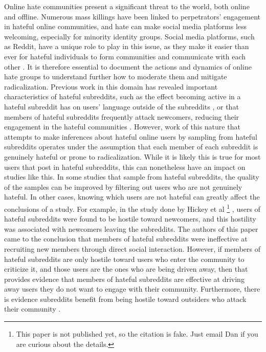 \documentclass[10pt,twocolumn,letterpaper]{article}
\begin{document}
Online hate communities present a significant threat to the world, both online and offline. Numerous mass killings have been linked to perpetrators’ engagement in hateful online communities, and hate can make social media platforms less welcoming, especially for minority identity groups. Social media platforms, such as Reddit, have a unique role to play in this issue, as they make it easier than ever for hateful individuals to form communities and communicate with each other \cite{caiani2015transnationalization}. It is therefore essential to document the actions and dynamics of online hate groups to understand further how to moderate them and mitigate radicalization. Previous work in this domain has revealed important characteristics of hateful subreddits, such as the effect becoming active in a hateful subreddit has on users' language outside of the subreddits \cite{Schmitz2022}, or that members of hateful subreddits frequently attack newcomers, reducing their engagement in the hateful communities \cite{hickey2023reddit}. However, work of this nature that attempts to make inferences about hateful online users by sampling from hateful subreddits operates under the assumption that each member of each subreddit is genuinely hateful or prone to radicalization. While it is likely this is true for most users that post in hateful subreddits, this can nonetheless have an impact on studies like this. In some studies that sample from hateful subreddits, the quality of the samples can be improved by filtering out users who are not genuinely hateful. In other cases, knowing which users are not hateful can greatly affect the conclusions of a study. For example, in the study done by Hickey et al \footnote{This paper is not published yet, so the citation is fake. Just email Dan if you are curious about the details.} \cite{hickey2023reddit}, users of hateful subreddits were found to be hostile toward newcomers, and this hostility was associated with newcomers leaving the subreddits. The authors of this paper came to the conclusion that members of hateful subreddits were ineffective at recruiting new members through direct social interaction. However, if members of hateful subreddits are only hostile toward users who enter the community to criticize it, and those users are the ones who are being driven away, then that provides evidence that members of hateful subreddits are effective at driving away users they do not want to engage with their community. Furthermore, there is evidence subreddits benefit from being hostile toward outsiders who attack their community \cite{kumar2018community}.
\end{document}
